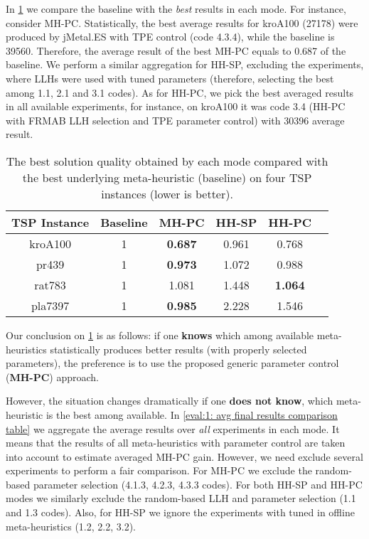 In \cref{eval:1: best final results comparison table} we compare the baseline with the \emph{best} results in each mode. For instance, consider MH-PC. Statistically, the best average results for kroA100 (27178) were produced by jMetal.ES with TPE control (code 4.3.4), while the baseline is 39560. Therefore, the average result of the best MH-PC equals to 0.687 of the baseline. We perform a similar aggregation for HH-SP, excluding the experiments, where LLHs were used with tuned parameters (therefore, selecting the best among 1.1, 2.1 and 3.1 codes). As for HH-PC, we pick the best averaged results in all available experiments, for instance, on kroA100 it was code 3.4 (HH-PC with FRMAB LLH selection and TPE parameter control) with 30396 average result.

\begin{table}[!htbp]
	\caption{The best solution quality obtained by each mode compared with the best underlying meta-heuristic (baseline) on four TSP instances (lower is better).}
	\label{eval:1: best final results comparison table}
	\begin{tabular}{cccccc}
		\hline
		\rowcolor{gray!10}
		\textbf{TSP Instance} & \textbf{Baseline} & \textbf{MH-PC} & \textbf{HH-SP} & \textbf{HH-PC} \\
		\hline		
		kroA100 & 1 & \textbf{0.687} & 0.961 & 0.768 \\
		pr439 & 1 & \textbf{0.973} & 1.072 & 0.988 \\
		rat783 	& 1 & 1.081 & 1.448 & \textbf{1.064} \\
		pla7397 & 1 & \textbf{0.985} & 2.228 & 1.546 \\
		\hline
	\end{tabular}
\end{table}

Our conclusion on \cref{eval:1: best final results comparison table} is as follows: if one \textbf{knows} which among available meta-heuristics statistically produces better results (with properly selected parameters), the preference is to use the proposed generic parameter control (\textbf{MH-PC}) approach. 

However, the situation changes dramatically if one \textbf{does not know}, which meta-heuristic is the best among available. In \cref{eval:1: avg final results comparison table} we aggregate the average results over \emph{all} experiments in each mode. It means that the results of all meta-heuristics with parameter control are taken into account to estimate averaged MH-PC gain. However, we need exclude several experiments to perform a fair comparison. For MH-PC we exclude the random-based parameter selection (4.1.3, 4.2.3, 4.3.3 codes). For both HH-SP and HH-PC modes we similarly exclude the random-based LLH and parameter selection (1.1 and 1.3 codes). Also, for HH-SP we ignore the experiments with tuned in offline meta-heuristics (1.2, 2.2, 3.2).

